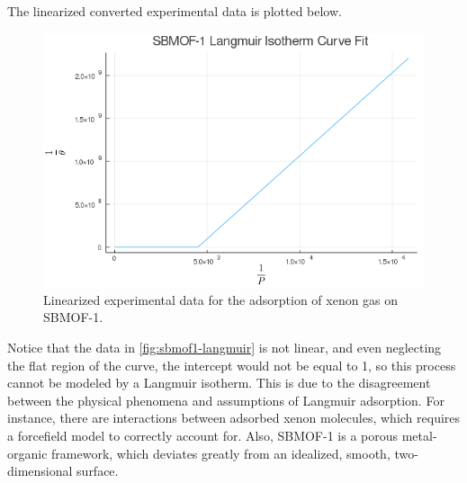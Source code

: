 \documentclass{article}
\begin{document}
The linearized converted experimental data is plotted below.
\begin{figure}[H]
    \centering
    \includegraphics[width=\textwidth]{fig/sbmof1-langmuir.png}
    \caption{Linearized experimental data for the adsorption of xenon gas on SBMOF-1.}
    \label{fig:sbmof1-langmuir}
\end{figure}
Notice that the data in \autoref{fig:sbmof1-langmuir} is not linear, and even neglecting the flat region of the curve, the intercept would not be equal to 1, so this process cannot be modeled by a Langmuir isotherm.
This is due to the disagreement between the physical phenomena and assumptions of Langmuir adsorption.
For instance, there are interactions between adsorbed xenon molecules, which requires a forcefield model to correctly account for.
Also, SBMOF-1 is a porous metal-organic framework, which deviates greatly from an idealized, smooth, two-dimensional surface.
\end{document}
